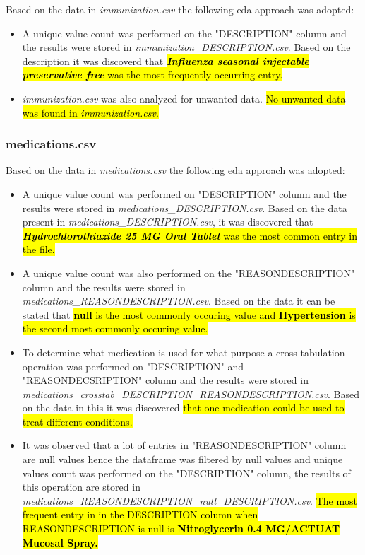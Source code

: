 \documentclass[12pt, twosided]{report}  %
\begin{document}
Based on the data in \textit{immunization.csv} the following eda approach was adopted:

\begin{itemize}
	\item A unique value count was performed on the "DESCRIPTION" column and the results were stored in \textit{immunization\_DESCRIPTION.csv}. Based on the description it was discoverd that \hl{\textit{\textbf{Influenza  seasonal  injectable  preservative free}} was the most frequently occurring entry.}
	
	\item \textit{immunization.csv} was also analyzed for unwanted data. \hl{No unwanted data was found in \textit{immunization.csv}.}
\end{itemize}

\subsubsection{medications.csv}

Based on the data in \textit{medications.csv} the following eda approach was adopted:

\begin{itemize}
	\item A unique value count was performed on "DESCRIPTION" column and the results were stored in \textit{medications\_DESCRIPTION.csv}. Based on the data present in \textit{medications\_DESCRIPTION.csv}, it was discovered that \hl{\textbf{\textit{Hydrochlorothiazide 25 MG Oral Tablet}} was the most common entry in the file.}
	
	\item A unique value count was also performed on the "REASONDESCRIPTION" column and the results were stored in \textit{medications\_REASONDESCRIPTION.csv}. Based on the data it can be stated that \hl{\textbf{null} is the most commonly occuring value and \textbf{Hypertension} is the second most commonly occuring value.}
	
	\item To determine what medication is used for what purpose a cross tabulation operation was performed on "DESCRIPTION" and "REASONDECSRIPTION" column and the results were stored in \textit{medications\_crosstab\_DESCRIPTION\_REASONDESCRIPTION.csv}. Based on the data in this it was discovered \hl{that one medication could be used to treat different conditions.}
	
	\item It was observed that a lot of entries in "REASONDESCRIPTION" column are null values hence the dataframe was filtered by null values and unique values count was performed on the "DESCRIPTION"  column, the results of this operation are stored in \textit{medications\_REASONDESCRIPTION\_null\_DESCRIPTION.csv}. \hl{The most frequent entry in in the DESCRIPTION column when REASONDESCRIPTION is null is \textbf{Nitroglycerin 0.4 MG/ACTUAT Mucosal Spray.}}
\end{itemize} 
\end{document}
